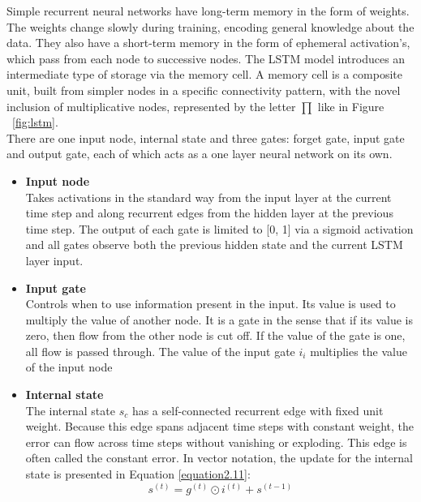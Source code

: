 Simple recurrent neural networks have long-term memory in the form of weights.
The weights change slowly during training, encoding general knowledge about
the data. They also have a short-term memory in the form of ephemeral activation's, which pass from each node to successive nodes. The LSTM model
introduces an intermediate type of storage via the memory cell. A memory cell
is a composite unit, built from simpler nodes in a specific connectivity pattern,
with the novel inclusion of multiplicative nodes, represented by the
letter $\prod$ like in Figure ~\ref{fig:lstm}.\\

There are one input node, internal state and three gates: forget gate, input gate and output gate, each of which acts as a one layer neural network on its own.
\begin{itemize}
    \item \textbf{Input node}\\
    Takes activations in the standard way from the input layer at the current time step and along recurrent edges from the hidden layer at the previous time step. The output of each gate is limited to [0, 1] via a sigmoid activation and all gates observe both the previous hidden state and the current LSTM layer input.
    
\item \textbf{Input gate}\\
Controls when to use information present in the input. Its value is used to multiply the value of another node. It is a gate in the sense that if its value is zero, then flow from the other node is cut off. If the value of the gate is one, all
flow is passed through. The value of the input gate $i_{i}$ multiplies the value
of the input node

\item \textbf{Internal state}\\
The internal state $s_{c}$ has a self-connected recurrent edge
with fixed unit weight. Because this edge spans adjacent time steps with
constant weight, the error can flow across time steps without vanishing or exploding. This edge is often called the constant error. In vector
notation, the update for the internal state is presented in Equation \ref{equation2.11}:
\begin{equation}\label{equation2.11}
     s^{(t)}=g^{(t)}\odot i^{(t)}+ s^{(t-1)}
\end{equation}


\end{itemize}
